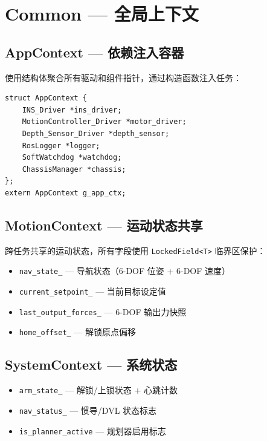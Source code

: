\documentclass[12pt,a4paper]{article}
\begin{document}
\section{Common — 全局上下文}

\subsection{AppContext — 依赖注入容器}

使用结构体聚合所有驱动和组件指针，通过构造函数注入任务：

\begin{lstlisting}[caption={AppContext 定义}]
struct AppContext {
    INS_Driver *ins_driver;
    MotionController_Driver *motor_driver;
    Depth_Sensor_Driver *depth_sensor;
    RosLogger *logger;
    SoftWatchdog *watchdog;
    ChassisManager *chassis;
};
extern AppContext g_app_ctx;
\end{lstlisting}

\subsection{MotionContext — 运动状态共享}

跨任务共享的运动状态，所有字段使用 \texttt{LockedField<T>} 临界区保护：
\begin{itemize}
    \item \texttt{nav\_state\_} — 导航状态（6-DOF 位姿 + 6-DOF 速度）
    \item \texttt{current\_setpoint\_} — 当前目标设定值
    \item \texttt{last\_output\_forces\_} — 6-DOF 输出力快照
    \item \texttt{home\_offset\_} — 解锁原点偏移
\end{itemize}

\subsection{SystemContext — 系统状态}

\begin{itemize}
    \item \texttt{arm\_state\_} — 解锁/上锁状态 + 心跳计数
    \item \texttt{nav\_status\_} — 惯导/DVL 状态标志
    \item \texttt{is\_planner\_active} — 规划器启用标志
\end{itemize}
\end{document}
